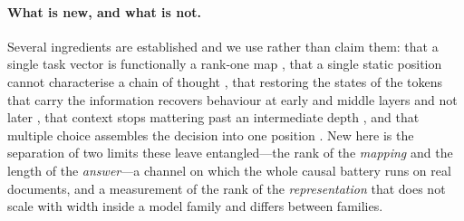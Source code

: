 \documentclass{article}
\begin{document}
\paragraph{What is new, and what is not.} Several ingredients are established
and we use rather than claim them: that a single task vector is functionally a
rank-one map \citep{dong2026taskvectorlimits}, that a single static position
cannot characterise a chain of thought \citep{dura2026sequentialpatching}, that
restoring the states of the tokens that carry the information recovers behaviour
at early and middle layers and not later \citep{meng2022rome,
geva2023dissecting}, that context stops mattering past an intermediate depth
\citep{onset2025instruction, sia2024incontexttranslation}, and that multiple
choice assembles the decision into one position \citep{wiegreffe2025mcq}. New here is the separation of two
limits these leave entangled---the rank of the \emph{mapping} and the length of
the \emph{answer}---a channel on which the whole causal battery runs on real
documents, and a measurement of the rank of the \emph{representation} that does
not scale with width inside a model family and differs between families.
\end{document}
